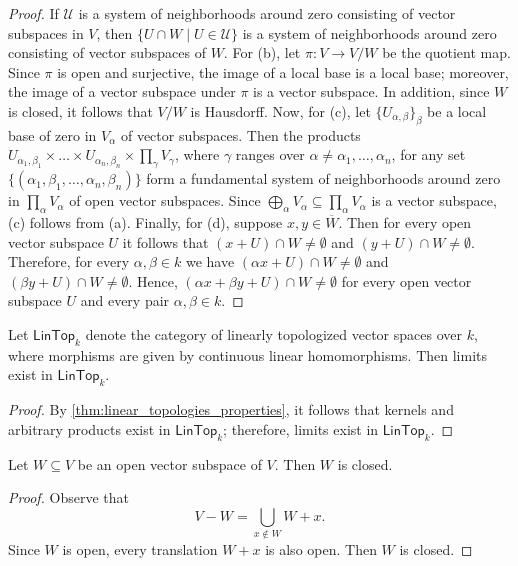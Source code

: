 \begin{proof}
	If $\mathscr{U}$ is a system of neighborhoods around zero consisting of vector subspaces in $V$, then $\{U\cap W\mid U \in \mathscr{U}\}$ is a system of neighborhoods around zero consisting of vector subspaces of $W$. For (b), let $\pi\colon V \to V/W$ be the quotient map. Since $\pi$ is open and surjective, the image of a local base is a local base; moreover, the image of a vector subspace under $\pi$ is a vector subspace. In addition, since $W$ is closed, it follows that $V/W$ is Hausdorff.  Now, for (c), let $\{U_{\alpha, \beta}\}_{\beta}$ be a local base of zero in $V_{\alpha}$ of vector subspaces. Then the products $U_{\alpha_{1}, \beta_{1}} \times \ldots \times U_{\alpha_{n}, \beta_{n}} \times \prod_{\gamma} V_{\gamma}$, where $\gamma$ ranges over $\alpha \neq \alpha_{1}, \ldots, \alpha_{n}$, for any set $\{(\alpha_{1}, \beta_{1}, \ldots, \alpha_{n}, \beta_{n})\}$ form a fundamental system of neighborhoods around zero in $\prod_{\alpha} V_{\alpha}$ of open vector subspaces. Since $\bigoplus_{\alpha} V_{\alpha} \subseteq \prod_{\alpha} V_{\alpha}$ is a vector subspace, (c) follows from (a). Finally, for (d), suppose $x,y\in \overline{W}$. Then for every open vector subspace $U$ it follows that $(x + U)\cap W \neq \emptyset$ and $(y + U)\cap W \neq \emptyset$. Therefore, for every $\alpha, \beta \in k$ we have $(\alpha x + U)\cap W \neq \emptyset$ and $(\beta y + U)\cap W \neq \emptyset$. Hence, $(\alpha x + \beta y + U)\cap W\neq \emptyset$ for every open vector subspace $U$ and every pair $\alpha, \beta\in k$. 
\end{proof}
\begin{corollary}\label{cor:limits-and-colimits-in-lintop-category}
	Let $\mathsf{LinTop}_{k}$ denote the category of linearly topologized vector spaces over $k$, where morphisms are given by continuous linear homomorphisms. Then limits exist in $\mathsf{LinTop}_{k}$. 
\end{corollary}
\begin{proof}
	By \cref{thm:linear_topologies_properties}, it follows that kernels and arbitrary products exist in $\mathsf{LinTop}_{k}$; therefore, limits exist in $\mathsf{LinTop}_{k}$. 
\end{proof}
\begin{proposition}\label{prop:open-implies-closed}
	Let $W \subseteq V$ be an open vector subspace of $V$. Then $W$ is closed.
\end{proposition}
\begin{proof}
	Observe that
	\[
		V - W = \bigcup_{x \notin W} W + x.
	\]
	Since $W$ is open, every translation $W + x$ is also open. Then $W$ is closed.
\end{proof}


